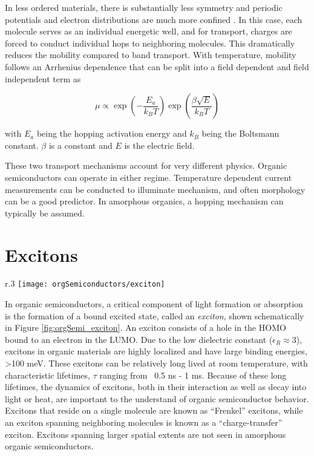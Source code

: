 \documentclass[../thesis.tex]{subfiles}
\begin{document}
In less ordered materials, there is substantially less symmetry and periodic potentials and electron distributions are much more confined .
In this case, each molecule serves as an individual energetic well, and for transport, charges are forced to conduct individual hops to neighboring molecules. 
This dramatically reduces the mobility compared to band transport.
With temperature, mobility follows an Arrhenius dependence that can be split into a field dependent and field independent term as

\begin{equation}
\mu \propto \exp\left(-\frac{E_a}{k_BT}\right)\exp\left(\frac{\beta\sqrt{E}}{k_B T}\right)
\end{equation}

with $E_a$ being the hopping activation energy and $k_B$ being the Boltsmann constant.
$\beta$ is a constant and $E$ is the electric field.

These two transport mechanisms account for very different physics.
Organic semiconductors can operate in either regime.
Temperature dependent current measurements can be conducted to illuminate mechanism, and often morphology can be a good predictor.
In amorphous organics, a hopping mechanism can typically be assumed.

\section{Excitons}\label{sec:excitons}

\begin{wrapfigure}{r}{.3\textwidth}
\centering
\texttt{[image: orgSemiconductors/exciton]}
\caption{Schematic view of an exciton.  $S_0$ and $S_1$ are the ground and first singlet excited state, respectively.}
\label{fig:orgSemi_exciton}
\end{wrapfigure}

In organic semiconductors, a critical component of light formation or absorption is the formation of a bound excited state, called an \textit{exciton}, shown schematically in Figure \ref{fig:orgSemi_exciton}.
An exciton consists of a hole in the HOMO bound to an electron in the LUMO.  
Due to the low dielectric constant ($\epsilon_R\approx 3$), excitons in organic materials are highly localized and have large binding energies, >100 meV.\supercite{Turro1991a,Reineke2007,Hains2010,Gregg2003a}
These excitons can be relatively long lived at room temperature, with characteristic lifetimes, $\tau$ ranging from ~0.5 ns - 1 ms. \supercite{Song2011,Park2010,Ryasnyanskiy2011,Wang2013,Erickson2014,Furno2012,Baldo2002,Mikhnenko} 
Because of these long lifetimes, the dynamics of excitons, both in their interaction as well as decay into light or heat, are important to the understand of organic semiconductor behavior.
Excitons that reside on a single molecule are known as ``Frenkel'' excitons, while an exciton spanning neighboring molecules is known as a ``charge-transfer'' exciton.
Excitons spanning larger spatial extents are not seen in amorphous organic semiconductors.
\end{document}
